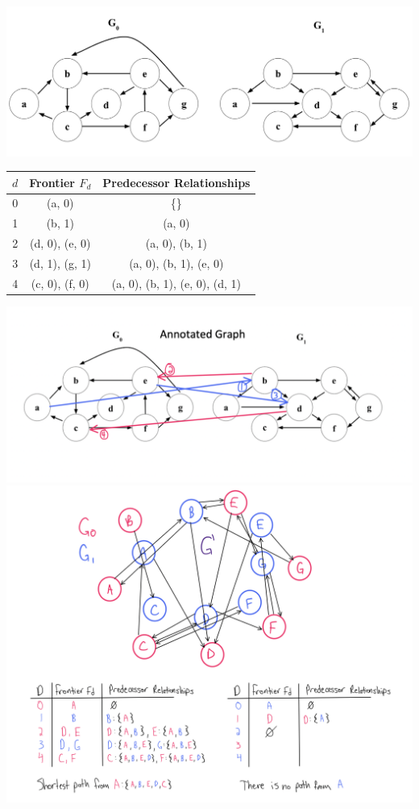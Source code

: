 \documentclass[11pt]{article}
\begin{document}
\begin{enumerate}
\begin{enumerate}
            \includegraphics[width=14cm]{ps4_graphs_new.png}
        \begin{table}[ht]
        \centering
        \begin{tabular}{c|c|c}
            $d$ & Frontier $F_d$& Predecessor Relationships \\
            \hline
               0 & (a, 0) &  \{\} \\
               1 & (b, 1) & {(a, 0)} \\
               2 & (d, 0), (e, 0) & {(a, 0), (b, 1)} \\
               3 & (d, 1), (g, 1) & {(a, 0), (b, 1), (e, 0)} \\
               4 & (c, 0), (f, 0) & {(a, 0), (b, 1), (e, 0), (d, 1)} \\
        \end{tabular}
        \end{table}
       \newline
        \includegraphics[scale=0.4]{3 b 1.png} 
       \newline
       \newline
        \includegraphics[scale=0.4]{3 b 2.png} 

\end{enumerate}
\end{enumerate}
\end{document}
